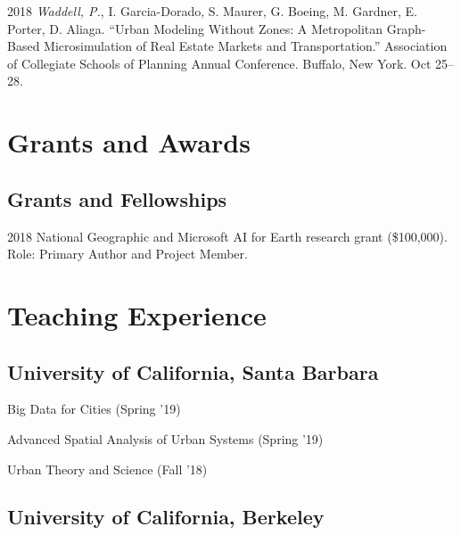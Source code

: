 \documentclass[12pt,letterpaper]{report}
\newcommand{\listitemspace}{0.15em}
\renewenvironment{itemize}
{\begin{list}{}{\setlength{\leftmargin}{0em}
			\setlength{\parskip}{0em}
			\setlength{\itemsep}{\listitemspace}
			\setlength{\parsep}{\listitemspace}}}
	{\end{list}}
\begin{document}
\begin{tablist}
\begin{tablist}
		\item[2018] \tab \textit{Waddell, P.}, I. Garcia-Dorado, S. Maurer, G. Boeing, M. Gardner, E. Porter, D. Aliaga. \enquote{Urban Modeling Without Zones: A Metropolitan Graph-Based Microsimulation of Real Estate Markets and Transportation.} Association of Collegiate Schools of Planning Annual Conference. Buffalo, New York. Oct 25--28.
				
	\end{tablist}
	
	
	
	\section*{Grants and Awards}
	
	\subsection*{Grants and Fellowships}
	
	\begin{tablist}
		
		\item[2018] \tab National Geographic and Microsoft AI for Earth research grant (\$100,000). Role: Primary Author and Project Member.
				
	\end{tablist}
	
	
	
	\section*{Teaching Experience}
	
	\subsection*{University of California, Santa Barbara}
	
	\begin{itemize}
		
		\item Big Data for Cities (Spring '19)
		
		\item Advanced Spatial Analysis of Urban Systems (Spring '19)
		
		\item Urban Theory and Science (Fall '18)
		
	\end{itemize}
	
	\subsection*{University of California, Berkeley}
	

\end{tablist}
\end{document}
